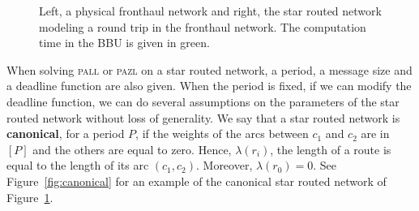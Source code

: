 \documentclass[a4paper,10pt]{article}
\newcommand\pazl{\textsc{pazl}\xspace}
\newcommand\pall{\textsc{pall}\xspace}
\begin{document}
\begin{figure}
\begin{center}
{\begin{tikzpicture}
\end{tikzpicture}
}




             \caption{Left, a physical fronthaul network and right, the star routed network modeling a round trip in the fronthaul network. The computation time in the BBU is given in green.}

	         \label{fig:star}
            \end{center}
	         \end{figure}
	         
  When solving \pall or \pazl on a star routed network, a period, a message size and a deadline function are also given. When the period is fixed, if we can modify the deadline function, we can do several assumptions on the parameters of the star routed network without loss of generality. We say that a star routed network is \textbf{canonical}, for a period $P$, if the weights of the arcs between $c_1$ and $c_2$ are in $[P]$ and the others are equal to zero. Hence, $\lambda(r_i)$, the length of a route is equal to the length of its arc $(c_1,c_2)$. Moreover, $\lambda(r_0) = 0$. See Figure~\ref{fig:canonical} for an example of the canonical star routed network of Figure~\ref{fig:star}.  
  
\end{document}
